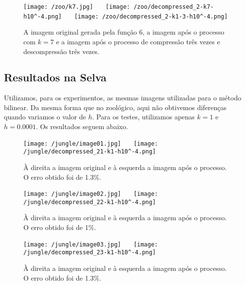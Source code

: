 \documentclass{article}
\begin{document}
		\begin{figure}[H]
			\centering
			\captionsetup{justification=centering}
			\texttt{[image: /zoo/k7.jpg]} \ \ \
			\texttt{[image: /zoo/decompressed\_2-k7-h10^-4.png]} \ \ \
			\texttt{[image: /zoo/decompressed\_2-k1-3-h10^-4.png]} \\
			\caption{A imagem original gerada pela função 6, a imagem após o processo com $k = 7$ e a imagem após o processo de compressão três vezes e descompressão três vezes.} 
		\end{figure}\par
		
		\subsection{Resultados na Selva}
		Utilizamos, para os experimentos, as mesmas imagens utilizadas para o método bilinear. Da mesma forma que no zoológico, aqui não obtivemos diferenças quando variamos o valor de $h$. Para os testes, utilizamos apenas $k = 1$ e $h = 0.0001$. Os resultados seguem abaixo.
		\begin{figure}[H]
			\centering
			\captionsetup{justification=centering}
			\texttt{[image: /jungle/image01.jpg]} \ \ \
			\texttt{[image: /jungle/decompressed\_21-k1-h10^-4.png]} \\
			\caption{À direita a imagem original e à esquerda a imagem após o processo. O erro obtido foi de 1.3\%.}  
		\end{figure}\par
		\begin{figure}[H]
			\centering
			\captionsetup{justification=centering}
			\texttt{[image: /jungle/image02.jpg]} \ \ \
			\texttt{[image: /jungle/decompressed\_22-k1-h10^-4.png]} \\
			\caption{À direita a imagem original e à esquerda a imagem após o processo. O erro obtido foi de 1\%.}  
		\end{figure}\par
		\begin{figure}[H]
			\centering
			\captionsetup{justification=centering}
			\texttt{[image: /jungle/image03.jpg]} \ \ \
			\texttt{[image: /jungle/decompressed\_23-k1-h10^-4.png]} \\
			\caption{À direita a imagem original e à esquerda a imagem após o processo. O erro obtido foi de 1.3\%.}  
		\end{figure}\par
\end{document}
